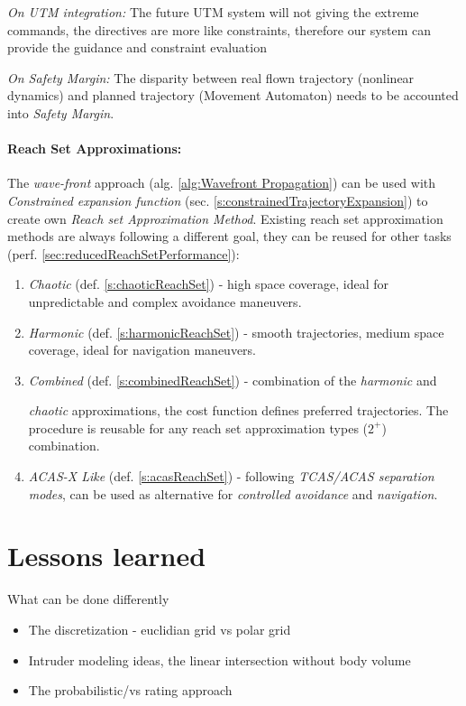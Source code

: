 \begin{note}
    \emph{On UTM integration:} The future UTM system will not giving the extreme commands, the directives are more like constraints, therefore our system can provide the guidance and constraint evaluation
\end{note}

\begin{note}
    \emph{On Safety Margin:} The disparity between real flown trajectory (nonlinear dynamics) and planned trajectory (Movement Automaton) needs to be accounted into \emph{Safety Margin}.
\end{note}

\paragraph{Reach Set Approximations:} The \emph{wave-front} approach (alg. \ref{alg:Wavefront Propagation}) can be used with \emph{Constrained expansion function} (sec. \ref{s:constrainedTrajectoryExpansion}) to create own \emph{Reach set Approximation Method}. Existing  reach set approximation methods are always following a different goal, they can be reused for other tasks (perf. \ref{sec:reducedReachSetPerformance}):

\begin{enumerate}
    \item \emph{Chaotic} (def. \ref{s:chaoticReachSet}) - high space coverage, ideal for unpredictable and complex avoidance maneuvers.
    
    \item \emph{Harmonic} (def. \ref{s:harmonicReachSet}) - smooth trajectories, medium space coverage, ideal for navigation maneuvers.
    \item \emph{Combined} (def. \ref{s:combinedReachSet}) - combination of the \emph{harmonic} and 
    
    \emph{chaotic} approximations, the cost function defines preferred trajectories. The procedure is reusable for any reach set approximation types ($2^+$) combination.
    
    \item \emph{ACAS-X Like} (def. \ref{s:acasReachSet}) - following \emph{TCAS/ACAS separation modes}, can be used as alternative for \emph{controlled avoidance} and \emph{navigation}.
\end{enumerate}


\section{Lessons learned}
What can be done differently
\begin{itemize}
	\item The discretization - euclidian grid vs polar grid
	\item Intruder modeling ideas, the linear intersection without body volume
	\item The probabilistic/vs rating approach
\end{itemize}

